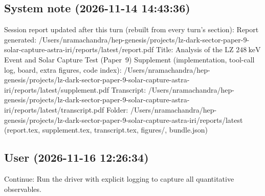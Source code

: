 \documentclass[11pt,a4paper]{article}
\begin{document}
\subsection*{System note \small(2026-11-14 14:43:36)}
Session report updated after this turn (rebuilt from every turn's section): Report generated: /Users/nramachandra/hep-genesis/projects/lz-dark-sector-paper-9-solar-capture-astra-iri/reports/latest/report.pdf Title: Analysis of the LZ $248\ \text{keV}$ Event and Solar Capture Test (Paper~9) Supplement (implementation, tool-call log, board, extra figures, code index): /Users/nramachandra/hep-genesis/projects/lz-dark-sector-paper-9-solar-capture-astra-iri/reports/latest/supplement.pdf Transcript: /Users/nramachandra/hep-genesis/projects/lz-dark-sector-paper-9-solar-capture-astra-iri/reports/latest/transcript.pdf Folder: /Users/nramachandra/hep-genesis/projects/lz-dark-sector-paper-9-solar-capture-astra-iri/reports/latest (report.tex, supplement.tex, transcript.tex, figures/, bundle.json)

\subsection*{User \small(2026-11-16 12:26:34)}
Continue: Run the driver with explicit logging to capture all quantitative observables.
\end{document}
